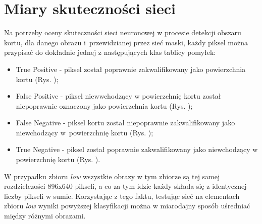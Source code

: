 \section{Miary skuteczności sieci}

Na potrzeby oceny skuteczności sieci neuronowej w procesie detekcji obszaru kortu, dla danego obrazu i~przewidzianej przez sieć maski, każdy piksel można przypisać do dokładnie jednej z następujących klas tablicy pomyłek:

\begin{itemize}
  \item True Positive - piksel został poprawnie zakwalifikowany jako powierzchnia kortu (Rys. );
  \item False Positive - piksel niewwchodzący w powierzchnię kortu został niepoprawnie oznaczony jako powierzchnia kortu (Rys. );
  \item False Negative - piksel kortu został niepoprawnie zakwalifikowany jako niewchodzący w~powierzchnię kortu (Rys. );
  \item True Negative - piksel został poprawnie zakwalifikowany jako niewchodzący w powierzchnię kortu (Rys. ).
\end{itemize}

W przypadku zbioru \textit{low} wszystkie obrazy w tym zbiorze są tej samej rozdzielczości 896x640 pikseli, a co za tym idzie każdy składa się z identycznej liczby pikseli w sumie.
Korzystając z tego faktu, testując sieć na elementach zbioru \textit{low} wyniki powyższej klasyfikacji można w miarodajny sposób uśredniać między różnymi obrazami.

